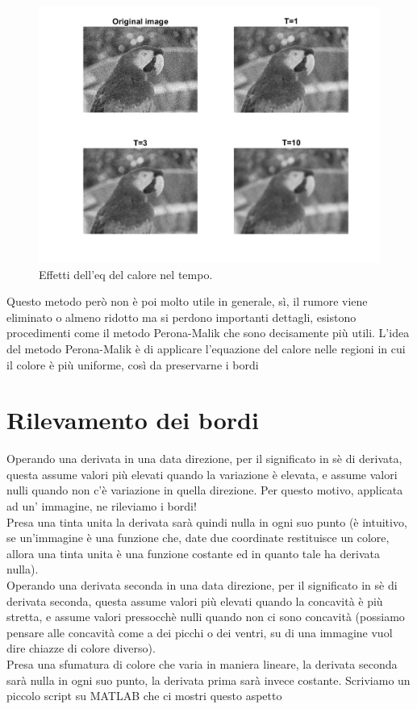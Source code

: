 \begin{figure}[htb] 
\centering
\includegraphics[scale=0.4]{Pictures/Risultati/eq del calore.png}
\caption{Effetti dell'eq del calore nel tempo.}\label{fig:figura}
\end{figure}


Questo metodo però non è poi molto utile in generale, sì, il rumore viene eliminato o almeno ridotto ma si perdono importanti dettagli, esistono procedimenti come il metodo Perona-Malik che sono decisamente più utili. L'idea del metodo Perona-Malik è di applicare l'equazione del calore nelle regioni in cui il colore è più uniforme, così da preservarne i bordi\\


\section{Rilevamento dei bordi}

Operando una derivata in una data direzione, per il significato in sè di derivata, questa assume valori più elevati quando la variazione è elevata, e assume valori nulli quando non c'è variazione in quella direzione. Per questo motivo, applicata ad un' immagine, ne rileviamo i bordi!\\
Presa una tinta unita la derivata sarà quindi nulla in ogni suo punto (è intuitivo, se un'immagine è una funzione che, date due coordinate restituisce un colore, allora una tinta unita è una funzione costante ed in quanto tale ha derivata nulla).\\
\vspace{1em}
Operando una derivata seconda in una data direzione, per il significato in sè di derivata seconda, questa assume valori più elevati quando la concavità è più stretta, e assume valori pressocchè nulli quando non ci sono concavità (possiamo pensare alle concavità come a dei picchi o dei ventri, su di una immagine vuol dire chiazze di colore diverso).\\
Presa una sfumatura di colore che varia in maniera lineare, la derivata seconda sarà nulla in ogni suo punto, la derivata prima sarà invece costante. 
Scriviamo un piccolo script su MATLAB che ci mostri questo aspetto

